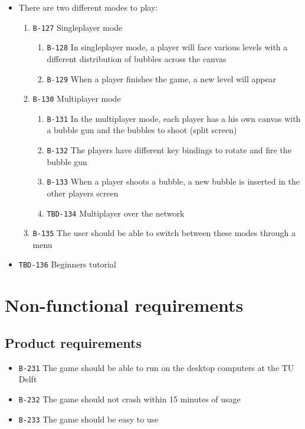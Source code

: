 \documentclass[a4paper]{article}
\begin{document}
\begin{itemize}
  \item There are two different modes to play:
  \begin{enumerate}
      \item \texttt{B-127} Singleplayer mode
      \begin{enumerate}
          \item \texttt{B-128} In singleplayer mode, a player will face various levels with a different distribution of bubbles across the canvas
          \item \texttt{B-129} When a player finishes the game, a new level will appear
      \end{enumerate}
      
      \item \texttt{B-130} Multiplayer mode
      \begin{enumerate}
          \item \texttt{B-131} In the multiplayer mode, each player has a his own canvas with a bubble gun and the bubbles to shoot (split screen)
          \item \texttt{B-132} The players have different key bindings to rotate and fire the bubble gun
          \item \texttt{B-133} When a player shoots a bubble, a new bubble is inserted in the other players screen
          \item \texttt{TBD-134} Multiplayer over the network
      \end{enumerate}
      
      \item \texttt{B-135} The user should be able to switch between these modes through a menu
  \end{enumerate}
  \item \texttt{TBD-136} Beginners tutorial
\end{itemize}

\section{Non-functional requirements}
\subsection{Product requirements}

\begin{itemize}
  \item \texttt{B-231} The game should be able to run on the desktop computers at the TU Delft
  \item \texttt{B-232} The game should not crash within 15 minutes of usage
  \item \texttt{B-233} The game should be easy to use
\end{itemize}
\end{document}
